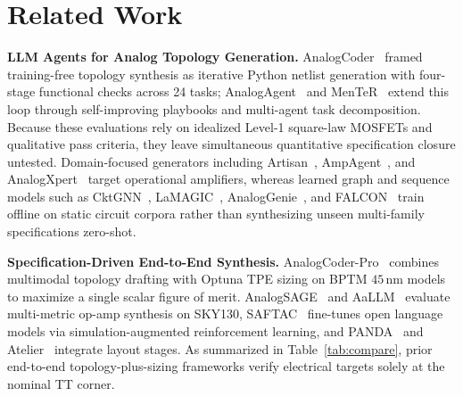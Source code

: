 \section{Related Work}
\label{sec:related}



\textbf{LLM Agents for Analog Topology Generation.}
AnalogCoder~\cite{lai2025analogcoder} framed training-free topology synthesis as iterative Python netlist generation with four-stage functional checks across 24 tasks; AnalogAgent~\cite{bao2026analogagent} and MenTeR~\cite{chen2025menter} extend this loop through self-improving playbooks and multi-agent task decomposition. Because these evaluations rely on idealized Level-1 square-law MOSFETs and qualitative pass criteria, they leave simultaneous quantitative specification closure untested. Domain-focused generators including Artisan~\cite{chen2024artisan}, AmpAgent~\cite{liu2024ampagent}, and AnalogXpert~\cite{zhang2025analogxpert} target operational amplifiers, whereas learned graph and sequence models such as CktGNN~\cite{dong2023cktgnn}, LaMAGIC~\cite{chang2024lamagic,chang2025lamagic2}, AnalogGenie~\cite{gao2025analoggenie}, and FALCON~\cite{mehradfar2025falcon} train offline on static circuit corpora rather than synthesizing unseen multi-family specifications zero-shot.

\textbf{Specification-Driven End-to-End Synthesis.}
AnalogCoder\allowbreak-Pro~\cite{lai2026analogcoderpro} combines multimodal topology drafting with Optuna TPE sizing on BPTM $45\,\mathrm{nm}$ models to maximize a single scalar figure of merit. AnalogSAGE~\cite{wang2025analogsage} and AaLLM~\cite{habib2026aallm} evaluate multi-metric op-amp synthesis on SKY130, SAFTAC~\cite{huang2026saftac} fine-tunes open language models via simulation-augmented reinforcement learning, and PANDA~\cite{zhang2026panda} and Atelier~\cite{shen2026atelier} integrate layout stages. As summarized in Table~\ref{tab:compare}, prior end-to-end topology-plus-sizing frameworks verify electrical targets solely at the nominal TT corner.

